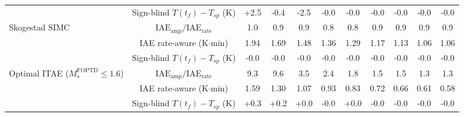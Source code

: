 \begin{table}[t]
{\begin{tabular}{lcccccccccc}
 & Sign-blind $T(t_f)-T_{sp}$ (K) & +2.5 & -0.4 & -2.5 & -0.0 & -0.0 & -0.0 & -0.0 & -0.0 & -0.0 \\
Skogestad SIMC & $\mathrm{IAE}_{\mathrm{amp}}/\mathrm{IAE}_{\mathrm{rate}}$ & 1.0 & 0.9 & 0.9 & 0.8 & 0.8 & 0.9 & 0.9 & 0.9 & 0.9 \\
 & IAE rate-aware (K$\cdot$min) & 1.94 & 1.69 & 1.48 & 1.36 & 1.29 & 1.17 & 1.13 & 1.06 & 1.06 \\
 & Sign-blind $T(t_f)-T_{sp}$ (K) & -0.0 & -0.0 & -0.0 & -0.0 & -0.0 & -0.0 & -0.0 & -0.0 & -0.0 \\
Optimal ITAE ($M_s^{\mathrm{FOPTD}} \leq 1.6$) & $\mathrm{IAE}_{\mathrm{amp}}/\mathrm{IAE}_{\mathrm{rate}}$ & 9.3 & 9.6 & 3.5 & 2.4 & 1.8 & 1.5 & 1.5 & 1.3 & 1.3 \\
 & IAE rate-aware (K$\cdot$min) & 1.59 & 1.30 & 1.07 & 0.93 & 0.83 & 0.72 & 0.66 & 0.61 & 0.58 \\
 & Sign-blind $T(t_f)-T_{sp}$ (K) & +0.3 & +0.2 & +0.0 & -0.0 & +0.0 & -0.0 & -0.0 & -0.0 & -0.0 \\
\bottomrule
\end{tabular}%
}
\end{table}
